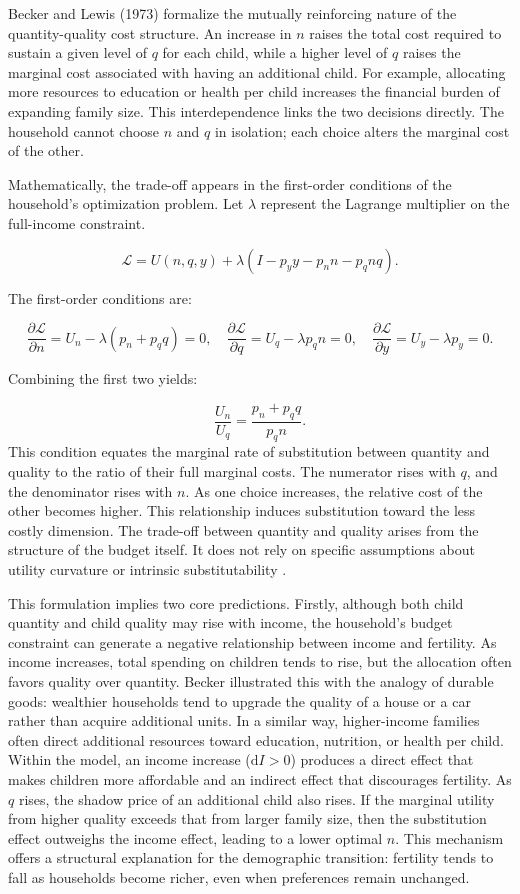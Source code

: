 \documentclass[]{AEA}
\begin{document}
Becker and Lewis (1973) formalize the mutually reinforcing nature of the
quantity-quality cost structure. An increase in \(n\) raises the total
cost required to sustain a given level of \(q\) for each child, while a
higher level of \(q\) raises the marginal cost associated with having an
additional child. For example, allocating more resources to education or
health per child increases the financial burden of expanding family
size. This interdependence links the two decisions directly. The
household cannot choose \(n\) and \(q\) in isolation; each choice alters
the marginal cost of the other.

Mathematically, the trade-off appears in the first-order conditions of
the household's optimization problem. Let \(\lambda\) represent the
Lagrange multiplier on the full-income constraint.

\[
\mathcal{L} = U(n, q, y) + \lambda \left( I - p_y y - p_n n - p_q n q \right).
\]

The first-order conditions are:

\[
\frac{\partial \mathcal{L}}{\partial n} = U_n - \lambda(p_n + p_q q) = 0, \quad
\frac{\partial \mathcal{L}}{\partial q} = U_q - \lambda p_q n = 0, \quad
\frac{\partial \mathcal{L}}{\partial y} = U_y - \lambda p_y = 0.
\]

Combining the first two yields:

\[
\frac{U_n}{U_q} = \frac{p_n + p_q q}{p_q n}.
\] This condition equates the marginal rate of substitution between
quantity and quality to the ratio of their full marginal costs. The
numerator rises with \(q\), and the denominator rises with \(n\). As one
choice increases, the relative cost of the other becomes higher. This
relationship induces substitution toward the less costly dimension. The
trade-off between quantity and quality arises from the structure of the
budget itself. It does not rely on specific assumptions about utility
curvature or intrinsic substitutability \citep{becker1973interaction}.

This formulation implies two core predictions. Firstly, although both
child quantity and child quality may rise with income, the household's
budget constraint can generate a negative relationship between income
and fertility. As income increases, total spending on children tends to
rise, but the allocation often favors quality over quantity. Becker
illustrated this with the analogy of durable goods: wealthier households
tend to upgrade the quality of a house or a car rather than acquire
additional units. In a similar way, higher-income families often direct
additional resources toward education, nutrition, or health per child.
Within the model, an income increase (\(\mathrm{d}I > 0\)) produces a
direct effect that makes children more affordable and an indirect effect
that discourages fertility. As \(q\) rises, the shadow price of an
additional child also rises. If the marginal utility from higher quality
exceeds that from larger family size, then the substitution effect
outweighs the income effect, leading to a lower optimal \(n\). This
mechanism offers a structural explanation for the demographic
transition: fertility tends to fall as households become richer, even
when preferences remain unchanged.
\end{document}
